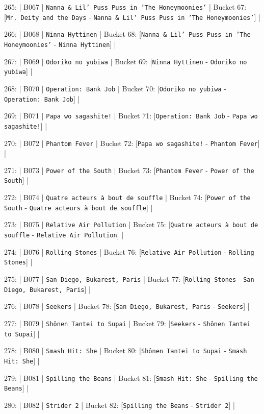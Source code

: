 \documentclass[11pt,a4paper]{article}
\begin{document}
{265: | B067 | \texttt{Nanna \& Lil' Puss Puss in 'The Honeymoonies'} | Bucket 67: [\texttt{Mr. Deity and the Days} - \texttt{Nanna \& Lil' Puss Puss in 'The Honeymoonies'}] |

266: | B068 | \texttt{Ninna Hyttinen} | Bucket 68: [\texttt{Nanna \& Lil' Puss Puss in 'The Honeymoonies'} - \texttt{Ninna Hyttinen}] |

267: | B069 | \texttt{Odoriko no yubiwa} | Bucket 69: [\texttt{Ninna Hyttinen} - \texttt{Odoriko no yubiwa}] |

268: | B070 | \texttt{Operation: Bank Job} | Bucket 70: [\texttt{Odoriko no yubiwa} - \texttt{Operation: Bank Job}] |

269: | B071 | \texttt{Papa wo sagashite!} | Bucket 71: [\texttt{Operation: Bank Job} - \texttt{Papa wo sagashite!}] |

270: | B072 | \texttt{Phantom Fever} | Bucket 72: [\texttt{Papa wo sagashite!} - \texttt{Phantom Fever}] |

271: | B073 | \texttt{Power of the South} | Bucket 73: [\texttt{Phantom Fever} - \texttt{Power of the South}] |

272: | B074 | \texttt{Quatre acteurs à bout de souffle} | Bucket 74: [\texttt{Power of the South} - \texttt{Quatre acteurs à bout de souffle}] |

273: | B075 | \texttt{Relative Air Pollution} | Bucket 75: [\texttt{Quatre acteurs à bout de souffle} - \texttt{Relative Air Pollution}] |

274: | B076 | \texttt{Rolling Stones} | Bucket 76: [\texttt{Relative Air Pollution} - \texttt{Rolling Stones}] |

275: | B077 | \texttt{San Diego, Bukarest, Paris} | Bucket 77: [\texttt{Rolling Stones} - \texttt{San Diego, Bukarest, Paris}] |

276: | B078 | \texttt{Seekers} | Bucket 78: [\texttt{San Diego, Bukarest, Paris} - \texttt{Seekers}] |

277: | B079 | \texttt{Shônen Tantei to Supai} | Bucket 79: [\texttt{Seekers} - \texttt{Shônen Tantei to Supai}] |

278: | B080 | \texttt{Smash Hit: She} | Bucket 80: [\texttt{Shônen Tantei to Supai} - \texttt{Smash Hit: She}] |

279: | B081 | \texttt{Spilling the Beans} | Bucket 81: [\texttt{Smash Hit: She} - \texttt{Spilling the Beans}] |

280: | B082 | \texttt{Strider 2} | Bucket 82: [\texttt{Spilling the Beans} - \texttt{Strider 2}] |

}
\end{document}
